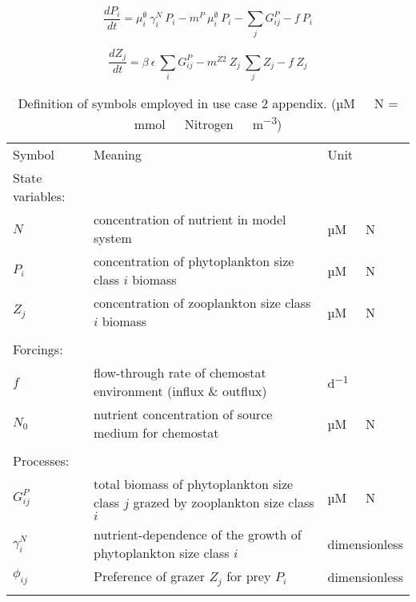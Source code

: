 \documentclass[template.tex]{subfiles}
\begin{document}
\begin{equation}
    \frac{d P_i}{d t} =
    \mu_i^{\emptyset} \  \gamma_i^N \   P_i  %
    - m^P  \ \mu_i^{\emptyset} \ P_i %
    - \sum_{j} G_{ij}^P %
    - f \ P_i
\end{equation}

\begin{equation}
    \frac{d Z_j}{d t} =
    \beta \ \epsilon \ \sum_{i} G_{ij}^P %
    - m^{Z2} \ Z_j \ \sum_{j} Z_j  %
    - f \ Z_j
\end{equation}




\clearpage


\begin{table*}[t]

\caption{ Definition of symbols employed in use case 2 appendix. (\unit{µM \ N} = \unit{mmol \ Nitrogen \ m^{-3}}) }

\begin{tabular}{l l l}
Symbol & Meaning & Unit\\
\tophline
\tophline
State variables:\\
\middlehline
$N$ & concentration of nutrient in model system & \unit{µM \ N} \\
$P_i$ & concentration of phytoplankton size class $i$ biomass  & \unit{µM \ N} \\
$Z_j$ & concentration of zooplankton size class $i$ biomass  & \unit{µM \ N} \\
\\

Forcings:\\
\middlehline
$f$ & flow-through rate of chemostat environment (influx \& outflux) & \unit{d^{-1}} \\
$N_0$ & nutrient concentration of source medium for chemostat & \unit{µM \ N} \\
\\


Processes:\\
\middlehline
$G_{ij}^P$ & total biomass of phytoplankton size class $j$ grazed by zooplankton size class $i$ & \unit{µM \ N} \\
$\gamma_i^N$ & nutrient-dependence of the growth of phytoplankton size class $i$ & dimensionless\\
$\phi_{ij}$ & Preference of grazer $Z_j$ for prey $P_i$ & dimensionless \\
\\


\end{tabular}
\end{table*}
\end{document}
